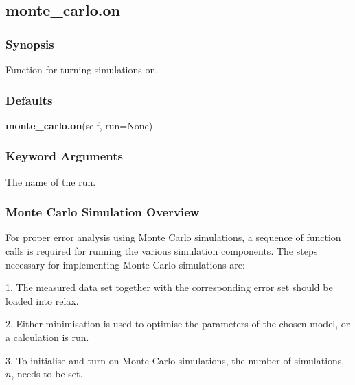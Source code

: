 

  

 \newpage 

 \subsection{monte\_carlo.on} 

  
 \subsubsection{Synopsis} 

 Function for turning simulations on. 
  

  
 \subsubsection{Defaults} 

 \textsf{\textbf{monte\_carlo.on}(self, run=None)} 

  
 \subsubsection{Keyword Arguments} 

   The name of the run.  

  

  
 \subsubsection{Monte Carlo Simulation Overview} 

 For proper error analysis using Monte Carlo simulations, a sequence of function calls is required for running the various simulation components.  The steps necessary for implementing Monte Carlo simulations are: 
  

 1.  The measured data set together with the corresponding error set should be loaded into relax. 
  

 2.  Either minimisation is used to optimise the parameters of the chosen model, or a calculation is run. 
  

 3.  To initialise and turn on Monte Carlo simulations, the number of simulations, $n$, needs to be set. 
  

